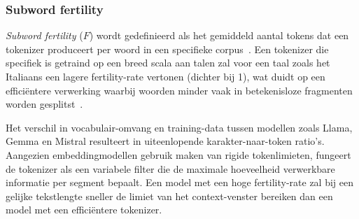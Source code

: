\subsubsection{Subword fertility}

\textit{Subword fertility} ($F$) wordt gedefinieerd als het gemiddeld aantal tokens dat een tokenizer produceert per woord in een specifieke corpus~\autocite{Brown1993}. Een tokenizer die specifiek is getraind op een breed scala aan talen zal voor een taal zoals het Italiaans een lagere fertility-rate vertonen (dichter bij 1), wat duidt op een efficiëntere verwerking waarbij woorden minder vaak in betekenisloze fragmenten worden gesplitst~\autocite{Liu2024}.

Het verschil in vocabulair-omvang en training-data tussen modellen zoals Llama, Gemma en Mistral resulteert in uiteenlopende karakter-naar-token ratio's. Aangezien embeddingmodellen gebruik maken van rigide tokenlimieten, fungeert de tokenizer als een variabele filter die de maximale hoeveelheid verwerkbare informatie per segment bepaalt. Een model met een hoge fertility-rate zal bij een gelijke tekstlengte sneller de limiet van het context-venster bereiken dan een model met een efficiëntere tokenizer.